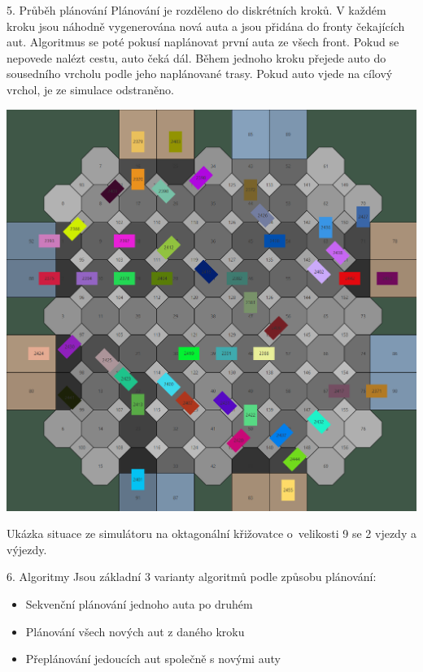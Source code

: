 \documentclass[portrait,fontscale=0.26,paperwidth=842mm,paperheight=1185mm]{baposter.cls}
\begin{document}
\begin{poster}
		\begin{posterbox}[column=1, name=planovani]{5. Průběh plánování}
			Plánování je rozděleno do diskrétních kroků.
			V každém kroku jsou náhodně vygenerována nová auta a jsou přidána do fronty čekajících aut.
			Algoritmus se poté pokusí naplánovat první auta ze všech front.
			Pokud se nepovede nalézt cestu, auto čeká dál.
			Během jednoho kroku přejede auto do sousedního vrcholu podle jeho naplánované trasy.
			Pokud auto vjede na cílový vrchol, je ze simulace odstraněno.
		\end{posterbox}


		\begin{posterbox}[column=1, name=ukazka, below=planovani]{}
			\begin{center}
				\includegraphics[width=0.79\linewidth]{img/simulator1}

				Ukázka situace ze simulátoru na oktagonální křižovatce o~velikosti 9 se 2 vjezdy a výjezdy.
			\end{center}
		\end{posterbox}

		\begin{posterbox}[column=1, name=algoritmy, below=ukazka]{6. Algoritmy}
			Jsou základní 3 varianty algoritmů podle způsobu plánování:
			\begin{itemize}
				\item Sekvenční plánování jednoho auta po druhém
				\item Plánování všech nových aut z daného kroku
				\item Přeplánování jedoucích aut společně s novými auty
			\end{itemize}


\end{posterbox}
\end{poster}
\end{document}
